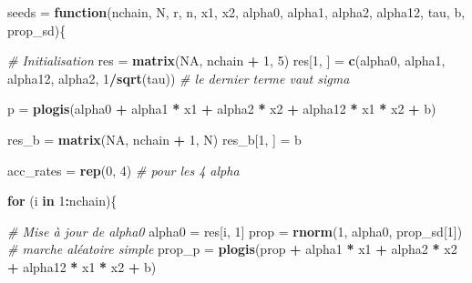 \documentclass[
]{article}
\newenvironment{Shaded}{\begin{snugshade}}{\end{snugshade}}
\newcommand{\CommentTok}[1]{\textcolor[rgb]{0.56,0.35,0.01}{\textit{#1}}}
\newcommand{\ConstantTok}[1]{\textcolor[rgb]{0.56,0.35,0.01}{#1}}
\newcommand{\ControlFlowTok}[1]{\textcolor[rgb]{0.13,0.29,0.53}{\textbf{#1}}}
\newcommand{\DecValTok}[1]{\textcolor[rgb]{0.00,0.00,0.81}{#1}}
\newcommand{\FunctionTok}[1]{\textcolor[rgb]{0.13,0.29,0.53}{\textbf{#1}}}
\newcommand{\NormalTok}[1]{#1}
\newcommand{\OtherTok}[1]{\textcolor[rgb]{0.56,0.35,0.01}{#1}}
\newcommand{\SpecialCharTok}[1]{\textcolor[rgb]{0.81,0.36,0.00}{\textbf{#1}}}
\begin{document}
\begin{Shaded}
\begin{Highlighting}[]
\NormalTok{seeds }\OtherTok{=} \ControlFlowTok{function}\NormalTok{(nchain, N, r, n, x1, x2, alpha0, alpha1, alpha2, alpha12, tau, b, prop\_sd)\{}
  
  \CommentTok{\# Initialisation}
\NormalTok{  res }\OtherTok{=} \FunctionTok{matrix}\NormalTok{(}\ConstantTok{NA}\NormalTok{, nchain }\SpecialCharTok{+} \DecValTok{1}\NormalTok{, }\DecValTok{5}\NormalTok{)}
\NormalTok{  res[}\DecValTok{1}\NormalTok{, ] }\OtherTok{=} \FunctionTok{c}\NormalTok{(alpha0, alpha1, alpha12, alpha2, }\DecValTok{1}\SpecialCharTok{/}\FunctionTok{sqrt}\NormalTok{(tau)) }\CommentTok{\# le dernier terme vaut sigma}

\NormalTok{  p }\OtherTok{=} \FunctionTok{plogis}\NormalTok{(alpha0 }\SpecialCharTok{+}\NormalTok{ alpha1 }\SpecialCharTok{*}\NormalTok{ x1 }\SpecialCharTok{+}\NormalTok{ alpha2 }\SpecialCharTok{*}\NormalTok{ x2 }\SpecialCharTok{+}\NormalTok{ alpha12 }\SpecialCharTok{*}\NormalTok{ x1 }\SpecialCharTok{*}\NormalTok{ x2 }\SpecialCharTok{+}\NormalTok{ b)}
  
\NormalTok{  res\_b }\OtherTok{=} \FunctionTok{matrix}\NormalTok{(}\ConstantTok{NA}\NormalTok{, nchain }\SpecialCharTok{+} \DecValTok{1}\NormalTok{, N)}
\NormalTok{  res\_b[}\DecValTok{1}\NormalTok{, ] }\OtherTok{=}\NormalTok{ b}
  
\NormalTok{  acc\_rates }\OtherTok{=} \FunctionTok{rep}\NormalTok{(}\DecValTok{0}\NormalTok{, }\DecValTok{4}\NormalTok{) }\CommentTok{\# pour les 4 alpha}
  
  \ControlFlowTok{for}\NormalTok{ (i }\ControlFlowTok{in} \DecValTok{1}\SpecialCharTok{:}\NormalTok{nchain)\{}
    
    \CommentTok{\# Mise à jour de alpha0}
\NormalTok{    alpha0 }\OtherTok{=}\NormalTok{ res[i, }\DecValTok{1}\NormalTok{]}
\NormalTok{    prop }\OtherTok{=} \FunctionTok{rnorm}\NormalTok{(}\DecValTok{1}\NormalTok{, alpha0, prop\_sd[}\DecValTok{1}\NormalTok{]) }\CommentTok{\# marche aléatoire simple}
\NormalTok{    prop\_p }\OtherTok{=} \FunctionTok{plogis}\NormalTok{(prop }\SpecialCharTok{+}\NormalTok{ alpha1 }\SpecialCharTok{*}\NormalTok{ x1 }\SpecialCharTok{+}\NormalTok{ alpha2 }\SpecialCharTok{*}\NormalTok{ x2 }\SpecialCharTok{+}\NormalTok{ alpha12 }\SpecialCharTok{*}\NormalTok{ x1 }\SpecialCharTok{*}\NormalTok{ x2 }\SpecialCharTok{+}\NormalTok{ b)}
    

\end{Highlighting}
\end{Shaded}
\end{document}

